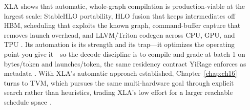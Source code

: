 XLA shows that automatic, whole-graph compilation is production-viable at the largest scale: StableHLO portability, HLO fusion that keeps intermediates off HBM, scheduling that exploits the known graph, command-buffer capture that removes launch overhead, and LLVM/Triton codegen across CPU, GPU, and TPU \citep{openxla2024,nvidia2024cudagraphs}. Its automation is its strength and its trap---it optimizes the operating point you give it---so the decode discipline is to compile and grade at batch-1 on bytes/token and launches/token, the same residency contract YiRage enforces as metadata \citep{patel2025llminference,yirage2026}. With XLA's automatic approach established, Chapter~\ref{chap:ch16} turns to TVM, which pursues the same multi-hardware goal through explicit search rather than heuristics, trading XLA's low effort for a larger reachable schedule space \citep{chen2018tvm,zheng2020ansor}.

